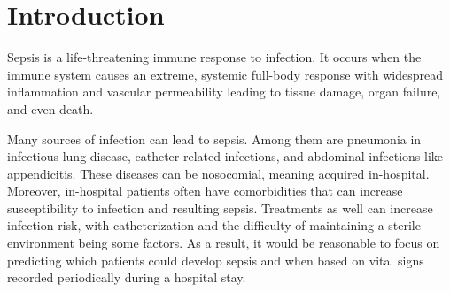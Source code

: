 \documentclass{article}
\theoremstyle{plain}
\theoremstyle{definition}
\theoremstyle{remark}
\begin{document}
\begin{abstract}

Early prediction of sepsis is critical for reducing mortality but remains difficult due to the heterogeneous and sparse nature of clinical time-series data. Using the 2019 PhysioNet Challenge framework—which evaluates models using a utility function emphasizing timely alerts—we compare three approaches for early sepsis detection against a logistic regression baseline: an autoencoder with k-nearest neighbors, an LSTM, and a Transformer. The challenge’s preprocessing pipeline includes forward-fill and population-mean imputation, missingness indicators, and optional temporal feature augmentations. Using a dataset of 11,000 patients, models with strong temporal inductive biases substantially outperform static or representation-learning methods. The Transformer achieved the highest normalized utility (0.578) with strong early-warning capability but a high false-positive rate, followed by the LSTM (0.261), while the autoencoder + k-NN model performed poorly (0.04). These results underscore the importance of modeling long-range physiological trajectories and highlight attention-based architectures as particularly effective for clinically meaningful early sepsis prediction.

\end{abstract}

\section{Introduction}
\label{submission}

Sepsis is a life-threatening immune response to infection. It occurs when the immune system causes an extreme, systemic full-body response with widespread inflammation and vascular permeability leading to tissue damage, organ failure, and even death.

Many sources of infection can lead to sepsis. Among them are pneumonia in infectious lung disease, catheter-related infections, and abdominal infections like appendicitis. These diseases can be nosocomial, meaning acquired in-hospital. Moreover, in-hospital patients often have comorbidities that can increase susceptibility to infection and resulting sepsis. Treatments as well can increase infection risk, with catheterization and the difficulty of maintaining a sterile environment being some factors. As a result, it would be reasonable to focus on predicting which patients could develop sepsis and when based on vital signs recorded periodically during a hospital stay.
\end{document}
